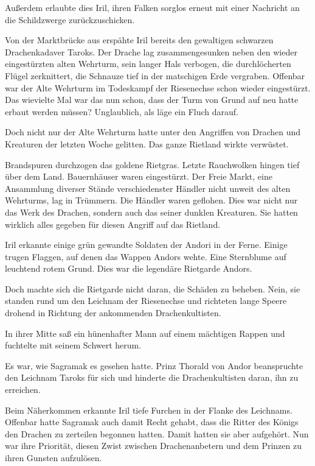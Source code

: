 Außerdem erlaubte dies Iril, ihren Falken sorglos erneut mit einer Nachricht an die Schildzwerge zurückzuschicken.

Von der Marktbrücke aus erspähte Iril bereits den gewaltigen schwarzen Drachenkadaver Taroks. Der Drache lag zusammengesunken neben den wieder eingestürzten alten Wehrturm, sein langer Hals verbogen, die durchlöcherten Flügel zerknittert, die Schnauze tief in der matschigen Erde vergraben. Offenbar war der Alte Wehrturm im Todeskampf der Riesenechse schon wieder eingestürzt. Das wievielte Mal war das nun schon, dass der Turm von Grund auf neu hatte erbaut werden müssen? Unglaublich, als läge ein Fluch darauf.

Doch nicht nur der Alte Wehrturm hatte unter den Angriffen von Drachen und Kreaturen der letzten Woche gelitten. Das ganze Rietland wirkte verwüstet.

Brandspuren durchzogen das goldene Rietgras. Letzte Rauchwolken hingen tief über dem Land. Bauernhäuser waren eingestürzt. Der Freie Markt, eine Ansammlung diverser Stände verschiedenster Händler nicht unweit des alten Wehrturms, lag in Trümmern. Die Händler waren geflohen. Dies war nicht nur das Werk des Drachen, sondern auch das seiner dunklen Kreaturen. Sie hatten wirklich alles gegeben für diesen Angriff auf das Rietland.

Iril erkannte einige grün gewandte Soldaten der Andori in der Ferne. Einige trugen Flaggen, auf denen das Wappen Andors wehte. Eine Sternblume auf leuchtend rotem Grund. Dies war die legendäre Rietgarde Andors.

Doch machte sich die Rietgarde nicht daran, die Schäden zu beheben. Nein, sie standen rund um den Leichnam der Riesenechse und richteten lange Speere drohend in Richtung der ankommenden Drachenkultisten.

In ihrer Mitte saß ein hünenhafter Mann auf einem mächtigen Rappen und fuchtelte mit seinem Schwert herum.

Es war, wie Sagramak es gesehen hatte. Prinz Thorald von Andor beanspruchte den Leichnam Taroks für sich und hinderte die Drachenkultisten daran, ihn zu erreichen.

Beim Näherkommen erkannte Iril tiefe Furchen in der Flanke des Leichnams. Offenbar hatte Sagramak auch damit Recht gehabt, dass die Ritter des Königs den Drachen zu zerteilen begonnen hatten. Damit hatten sie aber aufgehört. Nun war ihre Priorität, diesen Zwist zwischen Drachenanbetern und dem Prinzen zu ihren Gunsten aufzulösen.\bigskip







